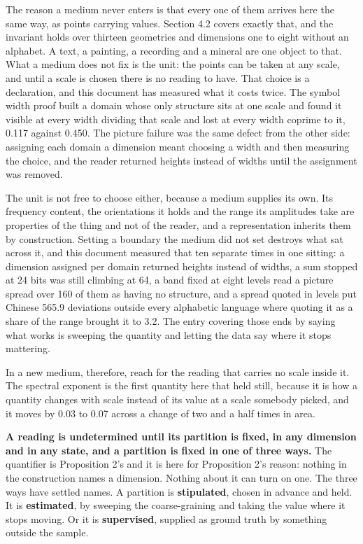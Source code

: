 The reason a medium never enters is that every one of them arrives here the same way, as points carrying values. Section 4.2 covers exactly that, and the invariant holds over thirteen geometries and dimensions one to eight without an alphabet. A text, a painting, a recording and a mineral are one object to that. What a medium does not fix is the unit: the points can be taken at any scale, and until a scale is chosen there is no reading to have. That choice is a declaration, and this document has measured what it costs twice. The symbol width proof built a domain whose only structure sits at one scale and found it visible at every width dividing that scale and lost at every width coprime to it, 0.117 against 0.450. The picture failure was the same defect from the other side: assigning each domain a dimension meant choosing a width and then measuring the choice, and the reader returned heights instead of widths until the assignment was removed.

The unit is not free to choose either, because a medium supplies its own. Its frequency content, the orientations it holds and the range its amplitudes take are properties of the thing and not of the reader, and a representation inherits them by construction. Setting a boundary the medium did not set destroys what sat across it, and this document measured that ten separate times in one sitting: a dimension assigned per domain returned heights instead of widths, a sum stopped at 24 bits was still climbing at 64, a band fixed at eight levels read a picture spread over 160 of them as having no structure, and a spread quoted in levels put Chinese 565.9 deviations outside every alphabetic language where quoting it as a share of the range brought it to 3.2. The entry covering those ends by saying what works is sweeping the quantity and letting the data say where it stops mattering.

In a new medium, therefore, reach for the reading that carries no scale inside it. The spectral exponent is the first quantity here that held still, because it is how a quantity changes with scale instead of its value at a scale somebody picked, and it moves by 0.03 to 0.07 across a change of two and a half times in area.

\textbf{A reading is undetermined until its partition is fixed, in any dimension and in any state, and a partition is fixed in one of three ways.} The quantifier is Proposition 2's and it is here for Proposition 2's reason: nothing in the construction names a dimension. Nothing about it can turn on one. The three ways have settled names. A partition is \textbf{stipulated}, chosen in advance and held. It is \textbf{estimated}, by sweeping the coarse-graining and taking the value where it stops moving. Or it is \textbf{supervised}, supplied as ground truth by something outside the sample.

